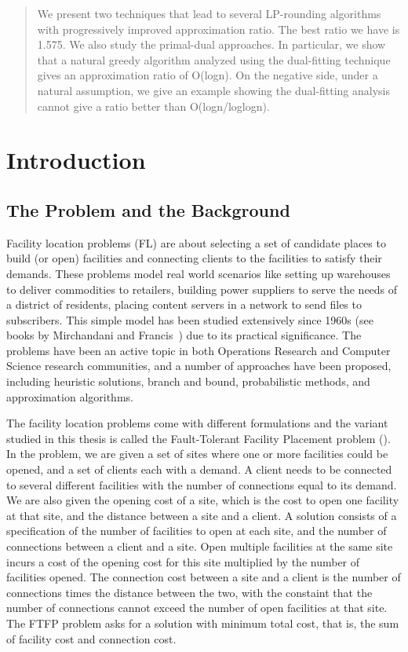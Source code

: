 \documentclass[oneside,final]{ucr}
\begin{document}
\begin{frontmatter}
\begin{abstract}
  We present two techniques that lead to several LP-rounding
  algorithms with progressively improved approximation
  ratio. The best ratio we have is 1.575. We also study the
  primal-dual approaches. In particular, we show that a
  natural greedy algorithm analyzed using the dual-fitting
  technique gives an approximation ratio of O(logn). On the
  negative side, under a natural assumption, we give an
  example showing the dual-fitting analysis cannot give a
  ratio better than O(logn/loglogn).
\end{abstract}

\tableofcontents
\listoffigures
\listoftables

\end{frontmatter}

\chapter{Introduction} \label{ch: intro}

\section{The Problem and the Background}
Facility location problems (FL) are about selecting a set of
candidate places to build (or open) facilities and
connecting clients to the facilities to satisfy their
demands. These problems model real world scenarios like
setting up warehouses to deliver commodities to retailers,
building power suppliers to serve the needs of a district of
residents, placing content servers in a network to send
files to subscribers. This simple model has been studied
extensively since 1960s (see books by Mirchandani and
Francis~\cite{Francis90}) due to its practical
significance. The problems have been an active topic in both
Operations Research and Computer Science research
communities, and a number of approaches have been proposed,
including heuristic solutions, branch and bound,
probabilistic methods, and approximation algorithms.

The facility location problems come with different
formulations and the variant studied in this thesis is
called the Fault-Tolerant Facility Placement problem
(\FTFP). In the {\FTFP} problem, we are given a set of sites
where one or more facilities could be opened, and a set of
clients each with a demand. A client needs to be connected
to several different facilities with the number of
connections equal to its demand. We are also given the
opening cost of a site, which is the cost to open one
facility at that site, and the distance between a site and a
client.  A solution consists of a specification of the
number of facilities to open at each site, and the number of
connections between a client and a site. Open multiple
facilities at the same site incurs a cost of the opening
cost for this site multiplied by the number of facilities
opened. The connection cost between a site and a client is
the number of connections times the distance between the
two, with the constaint that the number of connections
cannot exceed the number of open facilities at that
site. The FTFP problem asks for a solution with minimum
total cost, that is, the sum of facility cost and connection
cost.
\end{document}
